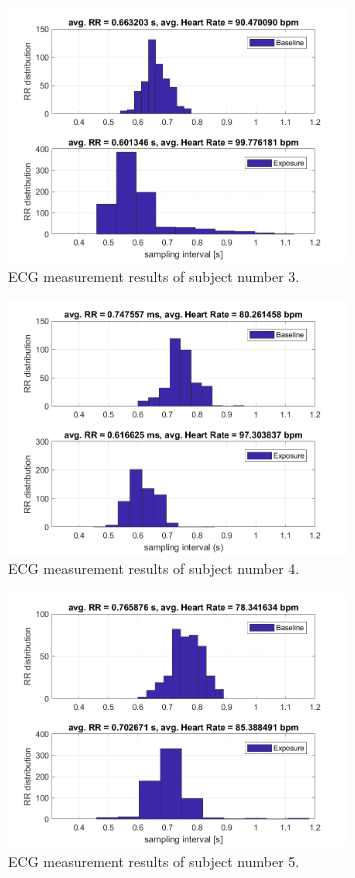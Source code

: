 \begin{figure}[H]
\centering
\includegraphics[width=0.8\textwidth]{images/3ECG.png}
\caption{ECG measurement results of subject number 3.}
\label{EDAtabImg}
\end{figure}

\begin{figure}[H]
\centering
\includegraphics[width=0.8\textwidth]{images/4ECG.png}
\caption{ECG measurement results of subject number 4.}
\label{EDAtabImg}
\end{figure}

\begin{figure}[H]
\centering
\includegraphics[width=0.8\textwidth]{images/5ECG.png}
\caption{ECG measurement results of subject number 5.}
\label{EDAtabImg}
\end{figure}

